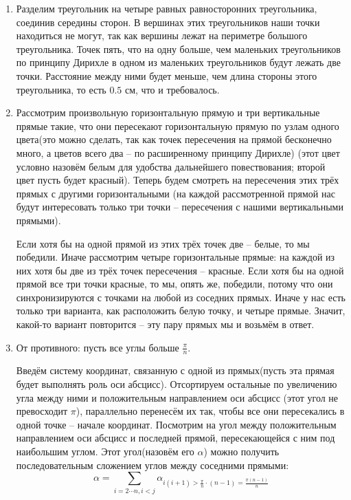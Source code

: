 \begin{enumerate}
	\item
		Разделим треугольник на четыре равных равносторонних треугольника, соединив середины сторон.
		В вершинах этих треугольников наши точки находиться не могут, так как вершины лежат на периметре большого треугольника.
		Точек пять, что на одну больше, чем маленьких треугольников \rightarrow по принципу Дирихле в одном из маленьких треугольников
		будут лежать две точки. Расстояние между ними будет меньше, чем длина стороны этого треугольника, то есть $0.5$ см,
		что и требовалось.
	
	\item
		Рассмотрим произвольную горизонтальную прямую и три вертикальные прямые такие, что они пересекают
		горизонтальную прямую по узлам одного цвета(это можно сделать, так как точек пересечения
		на прямой бесконечно много, а цветов всего два -- по расширенному принципу Дирихле)
		(этот цвет условно назовём белым для удобства дальнейшего повествования; второй цвет пусть будет красный).
		Теперь будем смотреть на пересечения этих трёх прямых с другими горизонтальными
		(на каждой рассмотренной прямой нас будут интересовать только три точки -- пересечения с нашими вертикальными прямыми).
		
		Если хотя бы на одной прямой из этих трёх точек две -- белые, то мы победили. 
		Иначе рассмотрим четыре горизонтальные прямые: на каждой из них хотя бы две из трёх точек пересечения -- красные.
		Если хотя бы на одной прямой все три точки красные, то мы, опять же, победили, потому что они синхронизируются
		с точками на любой из соседних прямых. Иначе у нас есть только три варианта, как расположить белую точку, и четыре прямые.
		Значит, какой-то вариант повторится -- эту пару прямых мы и возьмём в ответ.

	\item
		От противного: пусть все углы больше $\frac{\pi}{n}$.

		Введём систему координат, связанную с одной из прямых(пусть эта прямая будет выполнять роль оси абсцисс). 
		Отсортируем остальные по увеличению угла между ними и положительным направлением оси абсцисс
		(этот угол не превосходит $\pi$),
		параллельно перенесём их так, чтобы все они пересекались в одной точке -- начале координат.
		Посмотрим на угол между положительным направлением оси абсцисс и последней прямой, 
		пересекающейся с ним под наибольшим углом.
		Этот угол(назовём его $\alpha$) можно получить последовательным сложением углов между соседними прямыми:
		\[\alpha = \sum_{i = 2 \cdots n, i < j} \alpha_{i(i + 1) > \frac{\pi}{n} \cdot (n - 1) = \frac{\pi(n - 1)}{n}}\]


\end{enumerate}
